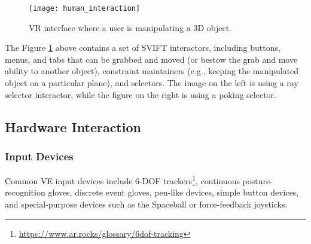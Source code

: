 \begin{figure}[h!]
    \centering
    \texttt{[image: human\_interaction]}
    \caption{\gls{VR} interface where a user is manipulating a \gls{3D} object. ~\cite{hale2014handbook}} %
    \label{fig:human_interaction}
\end{figure}
\FloatBarrier




The Figure \ref{fig:human_interaction} above contains a set of \gls{SVIFT} interactors, including buttons, menus, and tabs
that can be grabbed and moved (or bestow the grab and move ability to another object), constraint maintainers 
(e.g., keeping the manipulated object on a particular plane), and selectors. The image on the left is using a 
ray selector interactor, while the figure on the right is using a poking selector.


\subsection{Hardware Interaction}
\label{sec:hardware_interaction}

\subsubsection{Input Devices}
\label{sec:input_devices}

Common \gls{VE} input devices include \gls{6-DOF} trackers\footnote{\url{https://www.ar.rocks/glossary/6dof-tracking}}, continuous posture-recognition gloves, discrete 
event gloves, pen-like devices, simple button devices, and special-purpose devices such as the 
Spaceball or force-feedback joysticks. 

